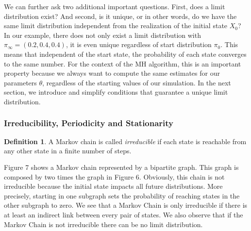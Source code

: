 \documentclass[12pt,english,a4paper,oneside]{article}
\theoremstyle{definition}
\newtheorem{definition}{Definition}[section]
\theoremstyle{definition}
\theoremstyle{definition}
\theoremstyle{definition}
\theoremstyle{remark}
\begin{document}
\noindent
We can further ask two additional important questions. First, does a limit distribution exist? And second, is it unique, or in other words, do we have the same limit distribution independent from the realization of the initial state \(X_0\)? In our example, there does not only exist a limit distribution with \(\pi_{\infty} = (0.2, 0.4, 0.4)\), it is even unique regardless of start distribution \(\pi_0\). This means that independent of the start state, the probability of each state converges to the same number. For the context of the MH algorithm, this is an important property because we always want to compute the same estimates for our parameters \(\theta\), regardless of the starting values of our simulation. In the next section, we introduce and simplify conditions that guarantee a unique limit distribution.

\hypertarget{irreducibility-periodicity-and-stationarity}{%
\subsubsection{Irreducibility, Periodicity and Stationarity}\label{irreducibility-periodicity-and-stationarity}}

\begin{definition}
A Markov chain is called \textit{irreducible} if each state is reachable from any other state in a finite number of steps.
\end{definition}

\noindent
Figure 7 shows a Markov chain represented by a bipartite graph. This graph is composed by two times the graph in Figure 6. Obviously, this chain is not irreducible because the initial state impacts all future distributions. More precisely, starting in one subgraph sets the probability of reaching states in the other subgraph to zero. We see that a Markov Chain is only irreducible if there is at least an indirect link between every pair of states. We also observe that if the Markov Chain is not irreducible there can be no limit distribution.
\end{document}
